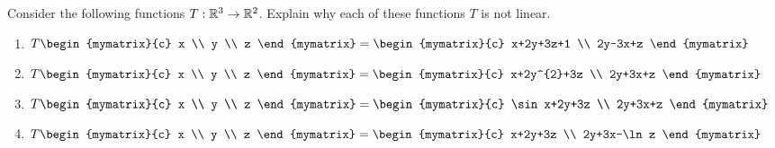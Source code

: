 \begin{ex} Consider the following functions $T:\mathbb{R}^{3}\rightarrow \mathbb{R}^{2}$.
  Explain why each of these functions $T$ is not linear.

  \begin{enumerate}
  \item $T\begin{mymatrix}{c}
      x \\
      y \\
      z
    \end{mymatrix} =\begin{mymatrix}{c}
      x+2y+3z+1 \\
      2y-3x+z
    \end{mymatrix} $

  \item $T\begin{mymatrix}{c}
      x \\
      y \\
      z
    \end{mymatrix} =\begin{mymatrix}{c}
      x+2y^{2}+3z \\
      2y+3x+z
    \end{mymatrix} $

  \item $T\begin{mymatrix}{c}
      x \\
      y \\
      z
    \end{mymatrix} =\begin{mymatrix}{c}
      \sin x+2y+3z \\
      2y+3x+z
    \end{mymatrix} $

  \item $T\begin{mymatrix}{c}
      x \\
      y \\
      z
    \end{mymatrix} =\begin{mymatrix}{c}
      x+2y+3z \\
      2y+3x-\ln z
    \end{mymatrix} $
  \end{enumerate}
\end{ex}


